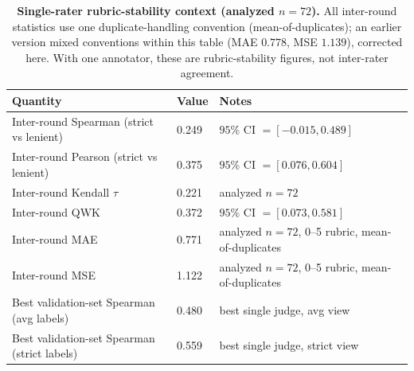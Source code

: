 \documentclass{article}
\begin{document}
\begin{table}[h]
  \centering
  \scriptsize
  \setlength{\tabcolsep}{2pt}%
  \begin{tabular}{@{}p{}p{}p{}@{}}
    \toprule
    \textbf{Quantity} & \textbf{Value} & \textbf{Notes} \\
    \midrule
    Inter-round Spearman (strict vs lenient) & 0.249 & $95\%$ CI $=[-0.015, 0.489]$ \\
    Inter-round Pearson (strict vs lenient)  & 0.375 & $95\%$ CI $=[0.076, 0.604]$ \\
    Inter-round Kendall $\tau$               & 0.221 & analyzed $n=72$ \\
    Inter-round QWK                          & 0.372 & $95\%$ CI $=[0.073, 0.581]$ \\
    Inter-round MAE                          & 0.771 & analyzed $n=72$, 0--5 rubric, mean-of-duplicates \\
    Inter-round MSE                          & 1.122 & analyzed $n=72$, 0--5 rubric, mean-of-duplicates \\
    Best validation-set Spearman (avg labels)    & 0.480 & best single judge, avg view \\
    Best validation-set Spearman (strict labels) & 0.559 & best single judge, strict view \\
    \bottomrule
  \end{tabular}
  \caption{\textbf{Single-rater rubric-stability context (analyzed $n=72$).}
    All inter-round statistics use one duplicate-handling convention (mean-of-duplicates); an earlier version mixed conventions within this table (MAE $0.778$, MSE $1.139$), corrected here.
    With one annotator, these are rubric-stability figures, not inter-rater agreement.}
  \label{tab:app-human-human-ceiling}
\end{table}
\end{document}
